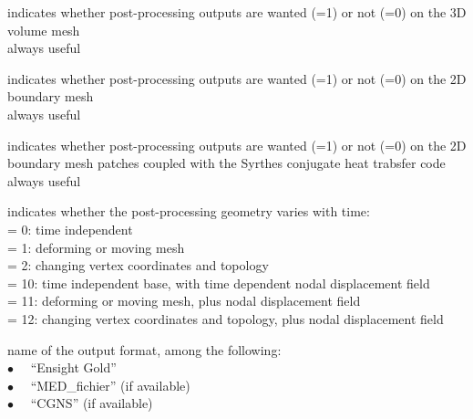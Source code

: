 {indicates whether post-processing outputs are wanted (=1) or not (=0)
on the 3D volume mesh\\
always useful}

{indicates whether post-processing outputs are wanted (=1) or not (=0)
on the 2D boundary mesh\\
always useful}

 {indicates whether post-processing outputs are wanted (=1) or not (=0)
 on the 2D boundary mesh patches coupled with the Syrthes conjugate
 heat trabsfer code\\
 always useful}

 {indicates whether the post-processing geometry varies with time:\\
 \hspace*{1.3cm}= 0: time independent\\
 \hspace*{1.3cm}= 1: deforming or moving mesh\\
 \hspace*{1.3cm}= 2: changing vertex coordinates and topology\\
 \hspace*{1.3cm}= 10: time independent base, with time dependent nodal displacement field\\
 \hspace*{1.3cm}= 11: deforming or moving mesh, plus nodal displacement field\\
 \hspace*{1.3cm}= 12: changing vertex coordinates and topology, plus nodal displacement field}

 {name of the output format, among the following:\\
 \hspace*{1.3cm}$\bullet\quad$ ``Ensight Gold''\\
 \hspace*{1.3cm}$\bullet\quad$ ``MED\_fichier'' (if available)\\
 \hspace*{1.3cm}$\bullet\quad$ ``CGNS'' (if available)}

